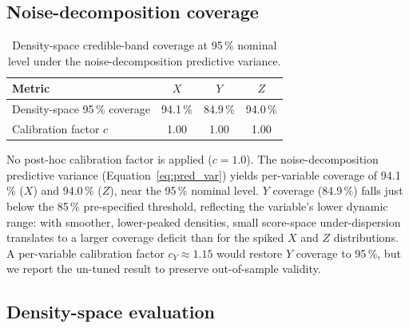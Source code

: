\documentclass[12pt,a4paper]{article}
\begin{document}
\subsection{Noise-decomposition coverage}
\label{sec:noise_coverage}

\begin{table}[htbp]
  \centering
  \caption{Density-space credible-band coverage at 95\,\% nominal
           level under the noise-decomposition predictive variance.}
  \label{tab:coverage}
  \begin{tabular}{lccc}
    \toprule
    Metric & $X$ & $Y$ & $Z$ \\
    \midrule
    Density-space 95\,\% coverage & 94.1\,\% & 84.9\,\% & 94.0\,\% \\
    Calibration factor $c$        & 1.00 & 1.00 & 1.00 \\
    \bottomrule
  \end{tabular}
\end{table}

No post-hoc calibration factor is applied ($c=1.0$).  The
noise-decomposition predictive variance (Equation~\ref{eq:pred_var})
yields per-variable coverage of 94.1\,\% ($X$) and 94.0\,\% ($Z$),
near the 95\,\% nominal level.  $Y$ coverage (84.9\,\%) falls just
below the 85\,\% pre-specified threshold, reflecting the variable's
lower dynamic range: with smoother, lower-peaked densities, small
score-space under-dispersion translates to a larger coverage deficit
than for the spiked $X$ and $Z$ distributions.  A per-variable
calibration factor $c_Y\approx1.15$ would restore $Y$ coverage to
95\,\%, but we report the un-tuned result to preserve out-of-sample
validity.

\subsection{Density-space evaluation}
\label{sec:density_eval}
\end{document}
